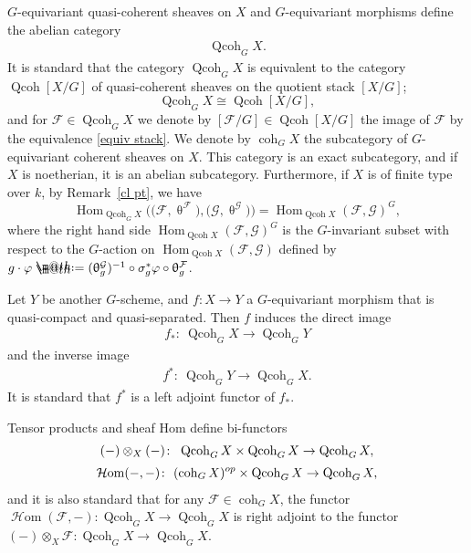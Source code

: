 \documentclass[11pt]{article}
\makeatletter
\numberwithin{equation}{section}
\newcommand*{\defeq}{\mathrel{\rlap{%
 \raisebox{0.3ex}{$\m@th\cdot$}}%
 \raisebox{-0.3ex}{$\m@th\cdot$}}%
 =}
\numberwithin{equation}{section}
\newcommand{\Hom}{\operatorname{Hom}}
\newcommand{\cHom}{\operatorname{{\mathcal H}om}}
\newcommand{\coh}{\operatorname{coh}}
\newcommand{\Qcoh}{\operatorname{Qcoh}}
\newcommand{\cF}{\mathcal{F}}
\newcommand{\cG}{\mathcal{G}}
\makeatother
\begin{document}
$G$-equivariant quasi-coherent sheaves on $X$ and $G$-equivariant morphisms define the abelian category
\begin{gather*}
\Qcoh_GX.
\end{gather*}
It is standard that the category $\Qcoh_GX$ is equivalent to the category $\Qcoh [X/G]$ of quasi-coherent sheaves on the quotient stack $[X/G]$;
\begin{equation}\label{equiv stack}
\Qcoh_GX\cong \Qcoh [X/G],
\end{equation}
 and for $\cF\in \Qcoh_GX$ we denote by $[\cF/G]\in \Qcoh [X/G]$ the image of $\cF$ by the equivalence \eqref{equiv stack}. We denote by $\coh_GX$ the subcategory of $G$-equivariant coherent sheaves on $X$. This category is an exact subcategory, and if $X$ is noetherian, it is an abelian subcategory. Furthermore, if $X$ is of finite type over $k$, by Remark~\ref{cl pt}, we have
\begin{equation}\label{G hom}
\Hom_{\Qcoh_GX}\big(\big(\cF,\uptheta^{\cF}\big),\big(\cG,\uptheta^{\cG}\big)\big) =\Hom_{\Qcoh X}(\cF,\cG)^G,
\end{equation}
where the right hand side $\Hom_{\Qcoh X}(\cF,\cG)^G$ is the $G$-invariant subset with respect to the $G$-action on $\Hom_{\Qcoh X}(\cF,\cG)$ defined by
$g\cdot\varphi\defeq (\uptheta^{\cG}_g)^{-1}\circ\sigma_g^*\varphi\circ\uptheta^{\cF}_g$.

Let $Y$ be another $G$-scheme, and $f\colon X\to Y$ a $G$-equivariant morphism that is quasi-compact and quasi-separated. Then $f$ induces the direct image\vspace{-.5ex}
\begin{gather*}
f_*\colon\ \Qcoh_G X\to \Qcoh_G Y
\end{gather*}
and the inverse image\vspace{-.5ex}
\begin{gather*}
f^*\colon\ \Qcoh_G Y\to \Qcoh_GX.
\end{gather*}
It is standard that $f^*$ is a left adjoint functor of $f_*$.

Tensor products and sheaf Hom define bi-functors
\begin{gather*}
(-)\otimes_{X}(-)\colon\ \Qcoh_G X\times \Qcoh_G X\to \Qcoh_G X,
\\[.5ex]
\cHom(-,-)\colon\ (\coh_G X)^{\rm op}\times \Qcoh_G X\to \Qcoh_G X,
\end{gather*}
and it is also standard that for any $\cF\in \coh_GX$, the functor $\cHom(\cF,-)\colon\Qcoh_G X\to \Qcoh_G X$ is right adjoint to the functor $(-)\otimes_{X}\cF\colon\Qcoh_G X\to \Qcoh_G X$.
\end{document}
